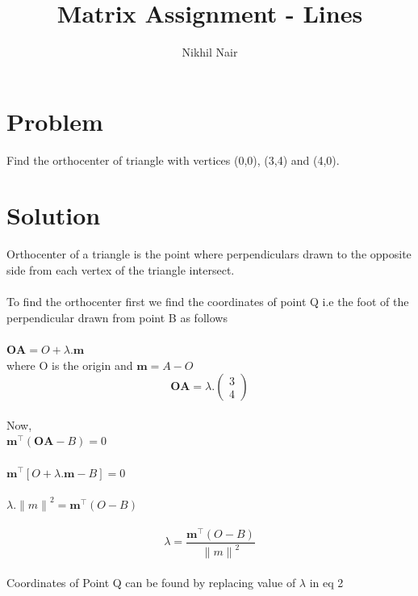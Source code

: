 \documentclass[journal,12pt,twocolumn]{IEEEtran}
\title{\mytitle}
\title{
Matrix Assignment - Lines
}
\author{Nikhil Nair}
\newcommand{\myvec}[1]{\ensuremath{\begin{pmatrix}#1\end{pmatrix}}}
\let\vec\mathbf
\begin{document}
\maketitle
\tableofcontents
\bigskip


\section{\textbf{Problem}}
Find the orthocenter of triangle with vertices (0,0), (3,4) and (4,0).\\


\section{\textbf{Solution}}
Orthocenter of a triangle is the point where perpendiculars drawn to the opposite side from each vertex of the triangle intersect.   \\
\\
To find the orthocenter first we find the coordinates of point Q i.e the foot of the perpendicular drawn from point B as follows\\
\\

${\vec{OA}}=O + \lambda.\vec{
  m}$
\\

where O is the origin and $\vec{m}= A-O$
\\
\begin{equation}
 \vec{OA}=\lambda.\myvec{
  3\\
  4}     \label{eq-1}
\end{equation}
\\
Now, 
\\

${\vec{m^{\top}}(\vec{OA}-B)} = 0$
\\
\\	

 $\vec{m^{\top}}[O + \lambda.\vec{m} - B ]= 0 $ 
\\
\\

$\lambda.{\lVert m \rVert}^2 = \vec{m^{\top}}(O-B)$
\\
\\
\begin{equation}
	\lambda=\frac{\vec {m^{\top}}(O-B)}{{\lVert m \rVert}^2} 
	\label{eq-2}
\end{equation}
\\
Coordinates of Point Q can be found by replacing value of $\lambda$ in eq 2
\\
\\
\end{document}
